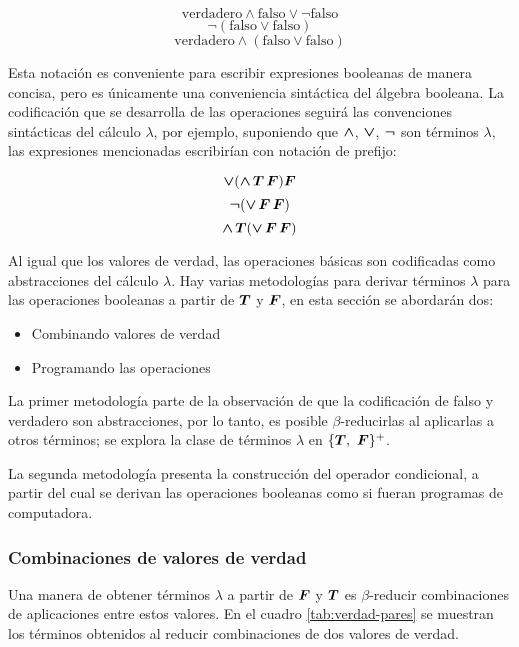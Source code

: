 \[ \mathrm{verdadero} \land \mathrm{falso} \lor \lnot \mathrm{falso} \]
\[ \lnot (\mathrm{falso} \lor \mathrm{falso}) \]
\[ \mathrm{verdadero} \land (\mathrm{falso} \lor \mathrm{falso}) \]

Esta notación es conveniente para escribir expresiones booleanas de manera concisa, pero es únicamente una conveniencia sintáctica del álgebra booleana. La codificación que se desarrolla de las operaciones seguirá las convenciones sintácticas del cálculo \( λ \), por ejemplo, suponiendo que \( \boldsymbol{\land} \), \( \boldsymbol{\lor} \), \( \boldsymbol{\lnot} \) son términos \( λ \), las expresiones mencionadas escribirían con notación de prefijo:

\[ \boldsymbol{\lor} (\boldsymbol{\land}\, \boldsymbol{T}\, \boldsymbol{F}) \boldsymbol{F} \]
\[ \boldsymbol{\lnot} (\boldsymbol{\lor}\, \boldsymbol{F}\, \boldsymbol{F}) \]
\[ \boldsymbol{\land}\, \boldsymbol{T} (\boldsymbol{\lor}\, \boldsymbol{F}\, \boldsymbol{F}) \]

Al igual que los valores de verdad, las operaciones básicas son codificadas como abstracciones del cálculo \( λ \). Hay varias metodologías para derivar términos \( λ \) para las operaciones booleanas a partir de \( \boldsymbol{T} \) y \( \boldsymbol{F} \), en esta sección se abordarán dos:

\begin{itemize}
\item Combinando valores de verdad
\item Programando las operaciones
\end{itemize}

La primer metodología parte de la observación de que la codificación de falso y verdadero son abstracciones, por lo tanto, es posible \( β \)-reducirlas al aplicarlas a otros términos; se explora la clase de términos \( λ \) en \( \{ \boldsymbol{T},\ \boldsymbol{F} \}^{+} \).

La segunda metodología presenta la construcción del operador condicional, a partir del cual se derivan las operaciones booleanas como si fueran programas de computadora.

\subsubsection{Combinaciones de valores de verdad}
\label{sec:combinacion-valores}

Una manera de obtener términos \( λ \) a partir de \( \boldsymbol{F} \) y \( \boldsymbol{T} \) es \( β \)-reducir combinaciones de aplicaciones entre estos valores. En el cuadro \ref{tab:verdad-pares} se muestran los términos obtenidos al reducir combinaciones de dos valores de verdad.

